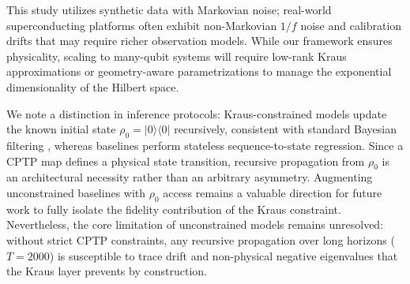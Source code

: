 \documentclass{article} %
\begin{document}
This study utilizes synthetic data with 
Markovian noise\citep{wiseman2010quantum}; real-world superconducting 
platforms often exhibit non-Markovian $1/f$ noise \citep{flurin2020rnn} 
and calibration drifts that may require richer observation models. While 
our framework ensures physicality, scaling to many-qubit systems will 
require low-rank Kraus approximations \citep{ahmed2023gdqpt,ateeq2025geometric} 
or geometry-aware parametrizations to manage the exponential dimensionality 
of the Hilbert space.

We note a distinction in inference protocols: Kraus-constrained models update the known initial state $\rho_0 = |0\rangle\langle0|$ recursively, consistent with standard Bayesian filtering \citep{emzir2017quantum, gordon1993novel, bouten2007introduction}, whereas baselines perform stateless sequence-to-state regression. Since a CPTP map defines a physical state transition, recursive propagation from $\rho_0$ is an architectural necessity rather than an arbitrary asymmetry. Augmenting unconstrained baselines with $\rho_0$ access remains a valuable direction for future work to fully isolate the fidelity contribution of the Kraus constraint. Nevertheless, the core limitation of unconstrained models remains unresolved: without strict CPTP constraints, any recursive propagation over long horizons ($T=2000$) is susceptible to trace drift and non-physical negative eigenvalues that the Kraus layer prevents by construction.
\end{document}
